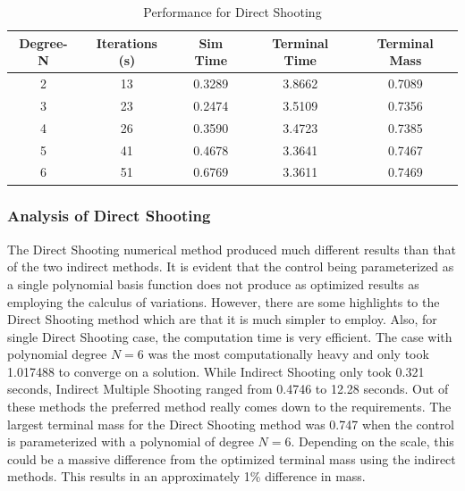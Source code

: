 \documentclass[]{article}
\begin{document}
\FloatBarrier
\begin{table}
	\centering
	\begin{tabular}{||c c c c c||} 
		\hline
		Degree-N & Iterations (s) & Sim Time & Terminal Time & Terminal Mass\\ [0.5ex] 
		\hline\hline
		2           & 13            & 0.3289     &  3.8662     & 0.7089\\
		\hline
		3           & 23            & 0.2474     &  3.5109     & 0.7356\\ 
		\hline
		4           & 26            & 0.3590     &  3.4723     & 0.7385\\ 
		\hline
		5           & 41            & 0.4678     &  3.3641     & 0.7467\\ 
		\hline
		6           & 51            & 0.6769     &  3.3611     & 0.7469\\ [1ex]
		\hline
	\end{tabular}
	\caption{Performance for Direct Shooting}
	\label{table:3}
\end{table}
\FloatBarrier
\subsubsection{Analysis of Direct Shooting}
The Direct Shooting numerical method produced much different results than that of the two indirect methods. It is evident that the control being parameterized as a single polynomial basis function does not produce as optimized results as employing the calculus of variations. However, there are some highlights to the Direct Shooting method which are that it is much simpler to employ. Also, for single Direct Shooting case, the computation time is very efficient. The case with polynomial degree \(N = 6\) was the most computationally heavy and only took 1.017488 to converge on a solution. While Indirect Shooting only took 0.321 seconds, Indirect Multiple Shooting ranged from 0.4746 to 12.28 seconds. Out of these methods the preferred method really comes down to the requirements. The largest terminal mass for the Direct Shooting method was 0.747 when the control is parameterized with a polynomial of degree \(N = 6\). Depending on the scale, this could be a massive difference from the optimized terminal mass using the indirect methods. This results in an approximately 1\% difference in mass.
\end{document}
